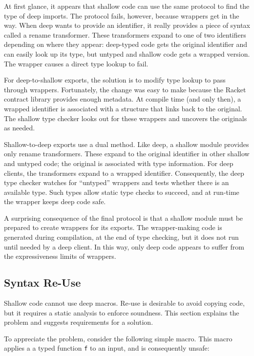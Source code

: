 \documentclass[ twoside,open=right,titlepage,numbers=noenddot,headinclude,%
                footinclude=true,cleardoublepage=empty,abstract=off,
                BCOR=5mm,paper=a4,fontsize=11pt,%
                ngerman,american,%
                parts,pdfspacing]{scrreprt}
\newcommand{\Scribtexttt}[1]{{\texttt{#1}}}
\newcommand{\Ssubsubsection}[2]{\subsubsection[#1]{#2}}
\renewcommand{\Ssubsubsection}[2]{\subsection[#1]{#2}}
\begin{document}
At first glance, it appears that shallow code can use the same protocol
 to find the type of deep imports.
The protocol fails, however, because wrappers get in the way.
When deep wants to provide an identifier, it really provides a piece of
 syntax called a rename transformer.
These transformers expand to one of two identifiers depending on where they
 appear: deep{-}typed code gets the original identifier and can easily
 look up its type, but untyped and shallow code gets a wrapped
 version.
The wrapper causes a direct type lookup to fail.

For deep{-}to{-}shallow exports, the solution is to modify
 type lookup to pass through wrappers.
Fortunately, the change was easy to make because the Racket contract library
 provides enough metadata.
At compile time (and only then), a wrapped identifier is associated with
 a structure that links back to the original.
The shallow type checker looks out for these wrappers and uncovers
 the originals as needed.

Shallow{-}to{-}deep exports use a dual method.
Like deep, a shallow module provides only rename transformers.
These expand to the original identifier in other shallow and untyped
 code; the original is associated with type information.
For deep clients, the transformers expand to a wrapped identifier.
Consequently, the deep type checker watches for {``}untyped{''} wrappers and
 tests whether there is an available type.
Such types allow static type checks to succeed, and at run{-}time the wrapper
 keeps deep code safe.

A surprising consequence of the final protocol is that a shallow module must
 be prepared to create wrappers for its exports.
The wrapper{-}making code is generated during compilation, at the end of
 type checking, but it does not run until needed by a deep client.
In this way, only deep code appears to suffer from the expressiveness
 limits of wrappers.

\Ssubsubsection{Syntax Re{-}Use}{Syntax Re{-}Use}\label{t:x28part_x22secx3abothx3aimplx3asyntaxx22x29}

Shallow code cannot use deep macros.
Re{-}use is desirable to avoid copying code, but it requires a static analysis
 to enforce soundness.
This section explains the problem and suggests requirements for a solution.

To appreciate the problem, consider the following simple macro.
This macro applies a a typed function \Scribtexttt{f} to an input, and is consequently
 unsafe:
\end{document}
